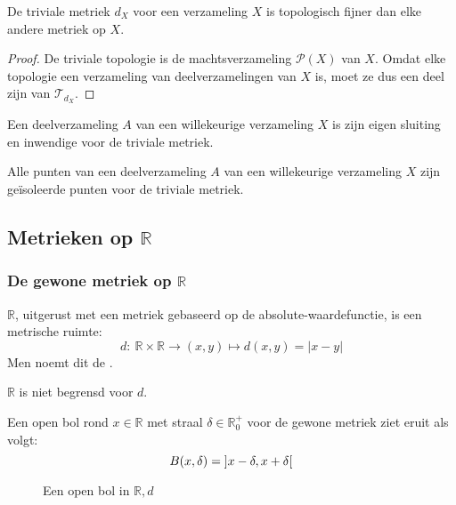 \documentclass[main.tex]{subfiles}
\begin{document}
\begin{st}
  De triviale metriek $d_{X}$ voor een verzameling $X$ is topologisch fijner dan elke andere metriek op $X$.

  \begin{proof}
    De triviale topologie is de machtsverzameling $\mathcal{P}(X)$ van $X$.
    Omdat elke topologie een verzameling van deelverzamelingen van $X$ is, moet ze dus een deel zijn van $\mathcal{T}_{d_{X}}$.
  \end{proof}
\end{st}

\begin{st}
  Een deelverzameling $A$ van een willekeurige verzameling $X$ is zijn eigen sluiting en inwendige voor de triviale metriek.
\end{st}

\begin{st}
  Alle punten van een deelverzameling $A$ van een willekeurige verzameling $X$ zijn ge\"isoleerde punten voor de triviale metriek.
\end{st}

\subsection{Metrieken op $\mathbb{R}$}
\label{sec:metrieken-op-mathbbr}

\subsubsection{De gewone metriek op $\mathbb{R}$}
\label{sec:de-gewone-metriek}

\begin{vb}
  $\mathbb{R}$, uitgerust met een metriek gebaseerd op de absolute-waardefunctie, is een metrische ruimte:
  \[ d:\ \mathbb{R}\times\mathbb{R}\rightarrow (x,y) \mapsto d(x,y)=|x-y| \]
  Men noemt dit de .
\end{vb}

\begin{opm}
  $\mathbb{R}$ is niet begrensd voor $d$.
\end{opm}

\begin{vb}
  Een open bol rond $x\in \mathbb{R}$ met straal $\delta\in \mathbb{R}_{0}^{+}$ voor de gewone metriek ziet eruit als volgt:
  \[ B(x,\delta) = \interval[open]{x-\delta}{x+\delta} \]
  \begin{figure}[H]
    \centering
    \caption{Een open bol in $\mathbb{R},d$}
  \end{figure}
\end{vb}
\end{document}
